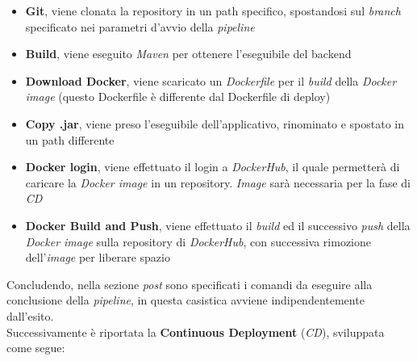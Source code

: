 \documentclass{article}
\begin{document}
\begin{itemize}[label = {-}]
    \itemsep0em
    \item \textbf{Git}, viene clonata la repository in un path specifico, spostandosi sul \textit{branch} specificato nei parametri d'avvio della \textit{pipeline}
    \item \textbf{Build}, viene eseguito \textit{Maven} per ottenere l'eseguibile del backend
    \item \textbf{Download Docker}, viene scaricato un \textit{Dockerfile} per il \textit{build} della \textit{Docker image} (questo Dockerfile è differente dal Dockerfile di deploy)
    \item \textbf{Copy .jar}, viene preso l'eseguibile dell'applicativo, rinominato e spostato in un path differente
    \item \textbf{Docker login}, viene effettuato il login a \textit{DockerHub}, il quale permetterà di caricare la \textit{Docker image} in un repository. \textit{Image} sarà necessaria per la fase di \textit{CD}
    \item \textbf{Docker Build and Push}, viene effettuato il \textit{build} ed il successivo \textit{push} della \textit{Docker image} sulla repository di \textit{DockerHub}, con successiva rimozione dell'\textit{image} per liberare spazio
\end{itemize}
Concludendo, nella sezione \textit{post} sono specificati i comandi da eseguire alla conclusione della \textit{pipeline}, in questa casistica avviene indipendentemente dall'esito.\vspace*{7pt}\\
Successivamente è riportata la \textbf{Continuous Deployment} (\textit{CD}), sviluppata come segue:
\end{document}

